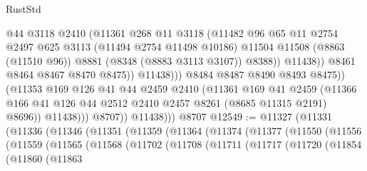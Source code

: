 \begin{lexlean}{RustStd}
\begin{coremodule}
{\begin{coremodule}
{{{{{{{{{{{{{{{{{{{{{{{{{{{{{{{{{{{{{{{{{{{{{{{{{{                                    @44
                                    @3118
                                    @2410
                                    (@11361
                                      @268
                                      @11
                                      @3118
                                      (@11482
                                        @96
                                        @65
                                        @11
                                        @2754
                                        @2497
                                        @625
                                        @3113
                                        (@11494 @2754 @11498 @10186)
                                        @11504
                                        @11508
                                        (@8863 (@11510 @96))
                                        @8881
                                        (@8348 (@8883 @3113 @3107))
                                        @8388))
                                    @11438))
                                @8461
                                @8464
                                @8467
                                @8470
                                @8475))
                            @11438)))
                      @8484
                      @8487
                      @8490
                      @8493
                      @8475))
                  (@11353
                    @169
                    @126
                    @41
                    @44
                    @2459
                    @2410
                    (@11361
                      @169
                      @41
                      @2459
                      (@11366 @166 @41 @126 @44 @2512 @2410 @2457 @8261 (@8685 @11315 @2191) @8696))
                    @11438)))
              @8707))
          @11438)))
    @8707
@12549 := @11327
    (@11331
      (@11336
        (@11346
          (@11351
            (@11359
              (@11364
                (@11374
                  (@11377
                    (@11550
                      (@11556
                        (@11559
                          (@11565
                            (@11568
                              (@11702
                                (@11708
                                  (@11711
                                    (@11717
                                      (@11720
                                        (@11854
                                          (@11860
                                            (@11863
}}}}}}}}}}}}}}}}}}}}}}}}}}}}}}}}}}}}}}}}}}}}}}}}}}
\end{coremodule}}
\end{coremodule}
\end{lexlean}
